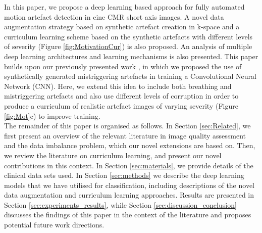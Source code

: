 \documentclass[preprint,12pt,authoryear]{elsarticle}
\begin{document}
In this paper, we propose a deep learning based approach for fully automated motion artefact detection in cine CMR short axis images. A novel data augmentation strategy based on synthetic artefact creation in k-space and a curriculum learning scheme based on the synthetic artefacts with different levels of severity (Figure \ref{fig:MotivationCur}) is also proposed. An analysis of multiple deep learning architectures and learning mechanisms is also presented. This paper builds upon our previously presented work \citep{Oksuz2018}, in which we proposed the use of synthetically generated mistriggering artefacts in training a Convolutional Neural Network (CNN). Here, we extend this idea to include both breathing and mistriggering artefacts and also use different levels of corruption in order to produce a curriculum of realistic artefact images of varying severity (Figure \ref{fig:Mot}c) to improve training.\\

The remainder of this paper is organised as follows. In Section \ref{sec:Related}, we first present an overview of the relevant literature in image quality assessment and the data imbalance problem, which our novel extensions are based on.
Then, we review the literature on curriculum learning, and present our novel contributions in this context.
In Section \ref{sec:materials}, we provide details of the clinical data sets used.
In Section \ref{sec:methods} we describe the deep learning models that we have utilised for classification, including descriptions of the novel data augmentation and curriculum learning approaches.
Results are presented in Section \ref{sec:experiments_results}, while Section \ref{sec:discussion_conclusion} discusses the findings of this paper in the context of the literature and proposes potential future work directions.
\end{document}
